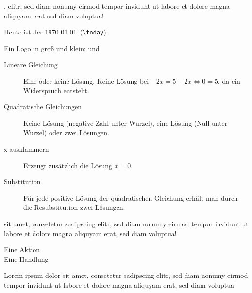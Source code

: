 \documentclass[
shownotess=true,
showresults=false,
edumath,
]{edu}
\begin{document}

 ,  \textrightarrow elitr, sed diam nonumy eirmod tempor invidunt ut labore et dolore magna aliquyam erat \textRightarrow sed diam voluptua! 

Heute ist der \today\ (\lstinline!\today!).

Ein Logo in groß und klein: \ccbysa und \ccbysa*
\begin{description}
	\item[Lineare Gleichung] Eine oder keine Lösung. Keine Lösung \zB bei $-2x = 5 - 2x \Leftrightarrow 0 = 5$, da ein Widerspruch entsteht.
	\item[Quadratische Gleichungen] Keine Lösung (negative Zahl unter Wurzel), eine Lösung (Null unter Wurzel) oder zwei Lösungen.
  \item[$\mathsf{x}$ ausklammern] Erzeugt zusätzlich die Lösung $x = 0$.
  \item[Substitution] Für jede positive Lösung der quadratischen Gleichung erhält man durch die Resubstitution zwei Lösungen.
\end{description}

 sit amet, consetetur sadipscing elitr, sed diam nonumy eirmod tempor invidunt ut labore et dolore magna aliquyam erat, sed diam voluptua!

\action Eine Aktion\\
\speech Eine Handlung


\newpage
Lorem ipsum dolor sit amet, consetetur sadipscing elitr, sed diam nonumy eirmod tempor invidunt ut labore et dolore magna aliquyam erat, sed diam voluptua! 
\end{document}
